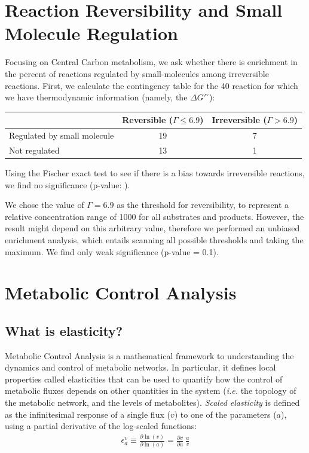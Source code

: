 \documentclass[12pt,a4paper]{article}
\begin{document}
\section{Reaction Reversibility and Small Molecule Regulation}

Focusing on Central Carbon metabolism, we ask whether there is enrichment in the percent of reactions regulated by small-molecules among irreversible reactions. First, we calculate the contingency table for the 40 reaction for which we have thermodynamic information (namely, the $\Delta G'^\circ$):

\begin{center}
	\begin{tabular}{|l|c|c|}
		\hline
		& Reversible ($\Gamma \leq 6.9$) & Irreversible ($\Gamma > 6.9$) \\ \hline
		Regulated by small molecule & 19 & 7  \\ \hline
		Not regulated & 13 & 1 \\ \hline
	\end{tabular}
\end{center}
Using the Fischer exact test to see if there is a bias towards irreversible reactions, we find no significance (p-value: ).

We chose the value of $\Gamma = 6.9$ as the threshold for reversibility, to represent a relative concentration range of 1000 for all substrates and products. However, the result might depend on this arbitrary value, therefore we performed an unbiased enrichment analysis, which entails scanning all possible thresholds and taking the maximum. We find only weak significance (p-value = 0.1).


\section{Metabolic Control Analysis}
\subsection{What is elasticity?}
Metabolic Control Analysis \cite{Fell1996-be} is a mathematical framework to understanding the dynamics and control of metabolic networks. In particular, it defines local properties called elasticities that can be used to quantify how the control of metabolic fluxes depends on other quantities in the system (\textit{i.e.} the topology of the metabolic network, and the levels of metabolites). \emph{Scaled elasticity} is defined as the infinitesimal response of a single flux ($v$) to one of the parameters ($a$), using a partial derivative of the log-scaled functions:
\begin{eqnarray}
    \epsilon_a^v \equiv \frac{\partial \ln(v)}{\partial \ln(a)} = \frac{\partial v}{\partial a} ~ \frac{a}{v}
\end{eqnarray}
\end{document}
